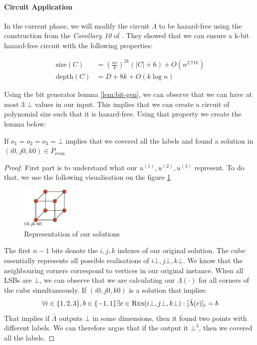 \paragraph{Circuit Application}

In the current phase, we will modify the circuit $\Lambda$ to be hazard-free using the construction
from the \textit{Corollary 10} of \cite{ikenmeyerComplexityHazardfreeCircuits2019}.
They showed that we can ensure a k-bit hazard-free circuit with the following properties:

\begin{align*}
\text{size}(C)  & =  \left( \frac{ne}{k}  \right)^{2k} (|C| + 6) + O (n^{2.71k}) \\
\text{depth}(C)  & =  D + 8k + O(k \log n)
\end{align*}

Using the bit generator lemma \ref{lem:bit-gen}, we can observe that we can have at most 3 $\bot$ values 
in our input. This implies that we can create a circuit of polynomial size such that it is hazard-free.
Using that property we create the lemma below:

\begin{lemma}
    \label{lem:circuit}
    If $o_1 = o_2 = o_3 = \bot$ implies that we covered all the labels and found a solution
    in $(i0,j0,k0) \in P_{\text{even}}$
\end{lemma}


\begin{proof}
    First part is to understand what our $u^{(1)}, u^{(2)}, u^{(3)}$
    represent. To do that, we use the following visualisation on the figure \ref{fig:main-proof:cube-vis}
    \begin{figure}[h!]
        \centering
        \includegraphics[width=0.2\textwidth]{assets/3d-cube.png}
        \caption{Representation of our solutions}\label{fig:main-proof:cube-vis}
    \end{figure}
    The first $n-1$ bits denote the $i,j,k$ indexes of our original solution.
    The cube essentially represents all possible realisations of $i\bot, j\bot, k\bot$.
    We know that the neighbouring corners correspond to vertices in our original instance.
    When all LSBs are $\bot$, we can observe that we are calculating our $\Lambda(\cdot)$
    for all corners of the cube simultaneously. If $(i0, j0, k0)$ is a solution
    that implies:
    $$
    \forall i \in \{1,2,3\}, b \in \{-1, 1\} \exists c \in \textsc{Res}(i\bot, j\bot, k\bot): [\bar{\Lambda}(c)]_i = b
    $$
    That implies if $\bar{\Lambda}$ outputs $\bot$ in some dimensions, then it found two points with different labels. We can therefore
    argue that if the output it $\bot^3$, then we covered all the labels.
\end{proof}



